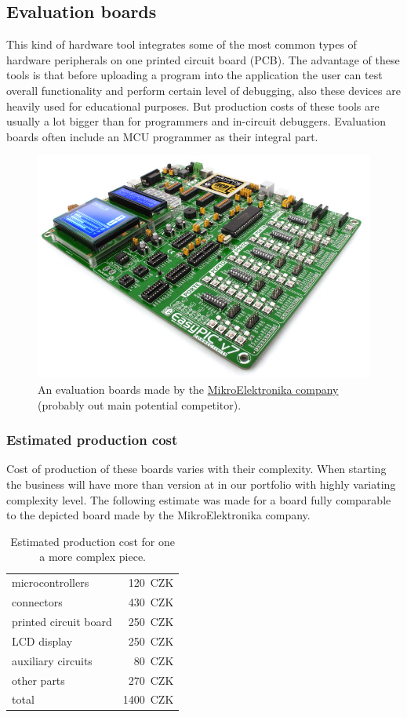 \documentclass[a4paper,twoside,15pt]{book}
\begin{document}
        \subsection{Evaluation boards}
            This kind of hardware tool integrates some of the most common types of hardware peripherals on one printed circuit board (PCB). The advantage of these tools is that before uploading a program into the application the user can test overall functionality and perform certain level of debugging, also these devices are heavily used for educational purposes. But production costs of these tools are usually a lot bigger than for programmers and in-circuit debuggers. Evaluation boards often include an MCU programmer as their integral part.

            \begin{figure}[h!]
                \centering{}
                \includegraphics[width=.5\textwidth]{images/snapshot0.png}
                \caption{An evaluation boards made by the \href{http://www.mikroe.com/}{MikroElektronika company} (probably out main potential competitor).}
            \end{figure}

            \subsubsection{Estimated production cost}
                Cost of production of these boards varies with their complexity. When starting the business will have more than version at in our portfolio with highly variating complexity level. The following estimate was made for a board fully comparable to the depicted board made by the MikroElektronika company.
                \begin{table}[h!]
                    \begin{tabular}{lr}
                        microcontrollers        & 120~CZK       \\
                        connectors              & 430~CZK       \\
                        printed circuit board   & 250~CZK       \\
                        LCD display             & 250~CZK       \\
                        auxiliary circuits      & 80~CZK        \\
                        other parts             & 270~CZK       \\\hline
                        total                   & 1400~CZK
                    \end{tabular}
                \caption{Estimated production cost for one a more complex piece.}
                \end{table}
\end{document}
